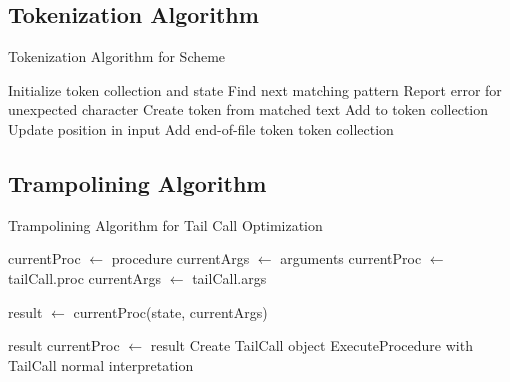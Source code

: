 \documentclass[final]{cmpreport_02}
\begin{document}
\subsection{Tokenization Algorithm} \label{app:tokenize}
\begin{algorithm}
\caption{Tokenization Algorithm for Scheme}
\label{alg:tokenize}
\begin{algorithmic}[1]
    \State Initialize token collection and state
        \State Find next matching pattern
            \State Report error for unexpected character
        \Else
            \State Create token from matched text
                \State Add to token collection
            \EndIf
            \State Update position in input
        \EndIf
    \EndWhile
    \State Add end-of-file token
    \State \Return token collection
\EndProcedure
\end{algorithmic}
\end{algorithm}
\subsection{Trampolining Algorithm} \label{app:trampoline}

\begin{algorithm}
\caption{Trampolining Algorithm for Tail Call Optimization}
\label{alg:trampoline}
\begin{algorithmic}[1]
\State currentProc $\gets$ procedure
\State currentArgs $\gets$ arguments
        \State currentProc $\gets$ tailCall.proc
        \State currentArgs $\gets$ tailCall.args
    \EndWhile
    
    \State result $\gets$ currentProc(state, currentArgs)
    
        \State \Return result
    \Else
        \State currentProc $\gets$ result
    \EndIf
\EndWhile
\EndProcedure
{}
\State Create TailCall object
\State \Return ExecuteProcedure with TailCall
\Else
\State \Return normal interpretation
\EndIf
\EndProcedure
\end{algorithmic}
\end{algorithm}
\end{document}
